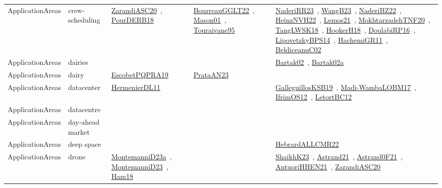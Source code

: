 {\begin{longtable}{lp{3cm}>{\raggedright\arraybackslash}p{6cm}>{\raggedright\arraybackslash}p{6cm}>{\raggedright\arraybackslash}p{8cm}}
ApplicationAreas & crew-scheduling & \href{works/ZarandiASC20.pdf}{ZarandiASC20}~\cite{ZarandiASC20}, \href{works/PourDERB18.pdf}{PourDERB18}~\cite{PourDERB18} & \href{works/BourreauGGLT22.pdf}{BourreauGGLT22}~\cite{BourreauGGLT22}, \href{works/Mason01.pdf}{Mason01}~\cite{Mason01}, \href{works/Touraivane95.pdf}{Touraivane95}~\cite{Touraivane95} & \href{works/NaderiRR23.pdf}{NaderiRR23}~\cite{NaderiRR23}, \href{works/WangB23.pdf}{WangB23}~\cite{WangB23}, \href{works/NaderiBZ22.pdf}{NaderiBZ22}~\cite{NaderiBZ22}, \href{works/HeinzNVH22.pdf}{HeinzNVH22}~\cite{HeinzNVH22}, \href{works/Lemos21.pdf}{Lemos21}~\cite{Lemos21}, \href{works/MokhtarzadehTNF20.pdf}{MokhtarzadehTNF20}~\cite{MokhtarzadehTNF20}, \href{works/TangLWSK18.pdf}{TangLWSK18}~\cite{TangLWSK18}, \href{works/HookerH18.pdf}{HookerH18}~\cite{HookerH18}, \href{works/DoulabiRP16.pdf}{DoulabiRP16}~\cite{DoulabiRP16}, \href{works/LipovetzkyBPS14.pdf}{LipovetzkyBPS14}~\cite{LipovetzkyBPS14}, \href{works/HachemiGR11.pdf}{HachemiGR11}~\cite{HachemiGR11}, \href{works/BeldiceanuC02.pdf}{BeldiceanuC02}~\cite{BeldiceanuC02}\\
ApplicationAreas & dairies &  &  & \href{works/Bartak02.pdf}{Bartak02}~\cite{Bartak02}, \href{works/Bartak02a.pdf}{Bartak02a}~\cite{Bartak02a}\\
ApplicationAreas & dairy & \href{works/EscobetPQPRA19.pdf}{EscobetPQPRA19}~\cite{EscobetPQPRA19} & \href{works/PrataAN23.pdf}{PrataAN23}~\cite{PrataAN23} & \\
ApplicationAreas & datacenter & \href{works/HermenierDL11.pdf}{HermenierDL11}~\cite{HermenierDL11} &  & \href{works/GalleguillosKSB19.pdf}{GalleguillosKSB19}~\cite{GalleguillosKSB19}, \href{works/Madi-WambaLOBM17.pdf}{Madi-WambaLOBM17}~\cite{Madi-WambaLOBM17}, \href{works/IfrimOS12.pdf}{IfrimOS12}~\cite{IfrimOS12}, \href{works/LetortBC12.pdf}{LetortBC12}~\cite{LetortBC12}\\
ApplicationAreas & datacentre &  &  & \\
ApplicationAreas & day-ahead market &  &  & \\
ApplicationAreas & deep space &  &  & \href{works/HebrardALLCMR22.pdf}{HebrardALLCMR22}~\cite{HebrardALLCMR22}\\
ApplicationAreas & drone & \href{works/MontemanniD23a.pdf}{MontemanniD23a}~\cite{MontemanniD23a}, \href{works/MontemanniD23.pdf}{MontemanniD23}~\cite{MontemanniD23}, \href{works/Ham18.pdf}{Ham18}~\cite{Ham18} &  & \href{works/ShaikhK23.pdf}{ShaikhK23}~\cite{ShaikhK23}, \href{works/Astrand21.pdf}{Astrand21}~\cite{Astrand21}, \href{works/Astrand0F21.pdf}{Astrand0F21}~\cite{Astrand0F21}, \href{works/AntuoriHHEN21.pdf}{AntuoriHHEN21}~\cite{AntuoriHHEN21}, \href{works/ZarandiASC20.pdf}{ZarandiASC20}~\cite{ZarandiASC20}\\

\end{longtable}}
